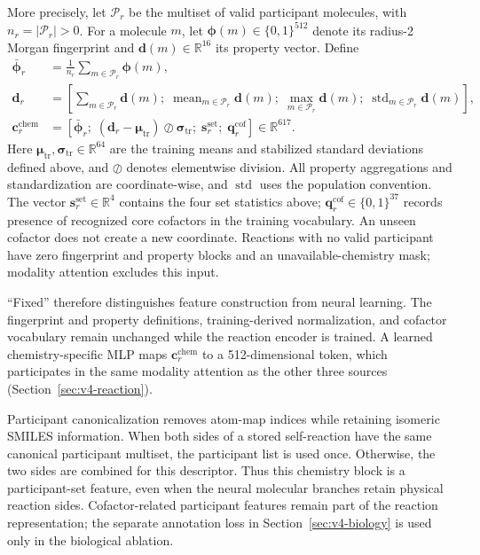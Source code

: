 More precisely, let $\mathcal P_r$ be the multiset of valid participant
molecules, with $n_r=|\mathcal P_r|>0$. For a molecule $m$, let
$\boldsymbol\phi(m)\in\{0,1\}^{512}$ denote its radius-2 Morgan fingerprint and
$\mathbf{d}(m)\in\mathbb R^{16}$ its property vector. Define
\begin{align}
 \bar{\boldsymbol\phi}_r&=\frac{1}{n_r}\sum_{m\in\mathcal P_r}\boldsymbol\phi(m),\\
 \mathbf{d}_r&=\left[\sum_{m\in\mathcal P_r}\mathbf{d}(m);\;
       \operatorname{mean}_{m\in\mathcal P_r}\mathbf{d}(m);\;
       \operatorname{max}_{m\in\mathcal P_r}\mathbf{d}(m);\;
       \operatorname{std}_{m\in\mathcal P_r}\mathbf{d}(m)\right],\\
 \mathbf{c}_r^{\mathrm{chem}}&=
   [\bar{\boldsymbol\phi}_r;\;(\mathbf{d}_r-\boldsymbol\mu_{\mathrm{tr}})\oslash\boldsymbol\sigma_{\mathrm{tr}};
     \;\mathbf{s}_r^{\mathrm{set}};\;\mathbf{q}_r^{\mathrm{cof}}]\in\mathbb R^{617}.
 \label{eq:v4-chemistry-vector}
\end{align}
Here $\boldsymbol\mu_{\mathrm{tr}},\boldsymbol\sigma_{\mathrm{tr}}\in\mathbb R^{64}$ are the
training means and stabilized standard deviations defined above, and
$\oslash$ denotes elementwise division. All property aggregations and standardization are coordinate-wise, and
$\operatorname{std}$ uses the population convention. The vector
$\mathbf{s}_r^{\mathrm{set}}\in\mathbb R^4$ contains the four set statistics above;
$\mathbf{q}_r^{\mathrm{cof}}\in\{0,1\}^{37}$ records presence of recognized core
cofactors in the training vocabulary. An unseen cofactor does not create a
new coordinate. Reactions with no valid participant have zero fingerprint
and property blocks and an unavailable-chemistry mask; modality attention
excludes this input.

``Fixed'' therefore distinguishes feature construction from neural learning.
The fingerprint and property definitions, training-derived normalization,
and cofactor vocabulary remain unchanged while the reaction encoder is
trained. A learned chemistry-specific MLP maps $\mathbf{c}_r^{\mathrm{chem}}$ to a
512-dimensional token, which participates in the same modality attention as
the other three sources (Section~\ref{sec:v4-reaction}).

Participant canonicalization removes atom-map indices while retaining
isomeric SMILES information. When both sides of a stored self-reaction have
the same canonical participant multiset, the participant list is used once.
Otherwise, the two sides are combined for this descriptor. Thus this chemistry
block is a participant-set feature, even when the neural molecular branches
retain physical reaction sides. Cofactor-related participant features remain
part of the reaction representation; the separate annotation loss in
Section~\ref{sec:v4-biology} is used only in the biological ablation.

